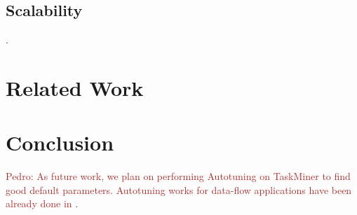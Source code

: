 \documentclass[sigplan,10pt,review,anonymous]{acmart}
\newcommand{\pedro}[1]{\noindent\textcolor{brown}{Pedro: {#1}}}
\newcommand{\pedro}[1]{}
\newcommand\Taskminer{\mbox{\textsf{TaskMiner}}}
\begin{document}
\subsection{Scalability}.

\section{Related Work}
\label{sec:rw}


\section{Conclusion}
\label{sec:conc}

\pedro{As future work, we plan on performing Autotuning on {\Taskminer} to find good default parameters.
Autotuning works for data-flow applications have been already done in \cite{Trancoso17, Emani15}}.


\end{document}
